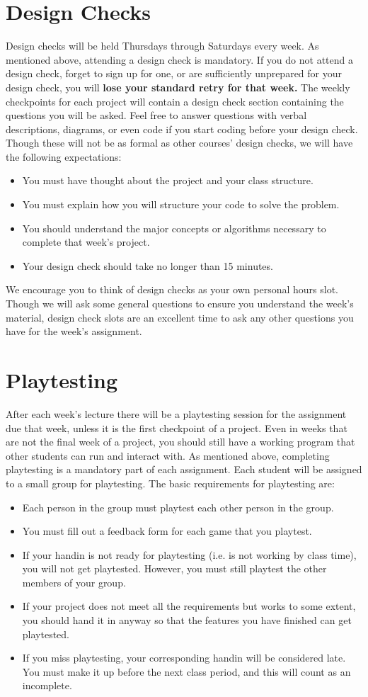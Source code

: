 \documentclass{cs1972}
\begin{document}
 \section*{Design Checks}
 Design checks will be held Thursdays through Saturdays every week. As mentioned above, attending a design check is mandatory. If you do not attend a design check, forget to sign up for one, or are sufficiently unprepared for your design check, you will \textbf{lose your standard retry for that week.} The weekly checkpoints for each project will contain a design check section containing the questions you will be asked. Feel free to answer questions with verbal descriptions, diagrams, or even code if you start coding before your design check. Though these will not be as formal as other courses' design checks, we will have the following expectations:
 \begin{itemize}
  \item You must have thought about the project and your class structure.
  \item You must explain how you will structure your code to solve the problem.
  \item You should understand the major concepts or algorithms necessary to complete that week's project.
  \item Your design check should take no longer than 15 minutes.
 \end{itemize}
We encourage you to think of design checks as your own personal hours slot. Though we will ask some general questions to ensure you understand the week's material, design check slots are an excellent time to ask any other questions you have for the week's assignment.
 \section*{Playtesting}
 After each week's lecture there will be a playtesting session for the assignment due that week, unless it is the first checkpoint of a project. Even in weeks that are not the final week of a project, you should still have a working program that other students can run and interact with. As mentioned above, completing playtesting is a mandatory part of each assignment. Each student will be assigned to a small group for playtesting. The basic requirements for playtesting are:
 \begin{itemize}
  \item Each person in the group must playtest each other person in the group.
  \item You must fill out a feedback form for each game that you playtest.
  \item If your handin is not ready for playtesting (i.e. is not working by class time), you will not get playtested. However, you must still playtest the other members of your group.
  \item If your project does not meet all the requirements but works to some extent, you should hand it in anyway so that the features you have finished can get playtested.
  \item If you miss playtesting, your corresponding handin will be considered late. You must make it up before the next class period, and this will count as an incomplete.
 \end{itemize}
\end{document}

